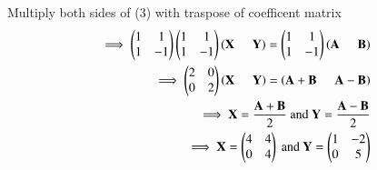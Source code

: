 \documentclass[journal]{IEEEtran}
\begin{document}
Multiply both sides of (3) with traspose of coefficent matrix
\begin{align}
    \implies \begin{pmatrix}
        1 & 1\\
         1 & -1
    \end{pmatrix} \begin{pmatrix}
        1 & 1\\
         1 & -1
    \end{pmatrix} \left(\mathbf{X}\hspace{0.5cm}\mathbf{Y}\right)=\begin{pmatrix}
        1 & 1\\
         1 & -1
    \end{pmatrix} \left(\mathbf{A}\hspace{0.5cm}\mathbf{B}\right)\\
    \implies \begin{pmatrix}
        2 & 0\\
         0 & 2
    \end{pmatrix} \left(\mathbf{X}\hspace{0.5cm}\mathbf{Y}\right)= \left(\mathbf{A+B}\hspace{0.5cm}\mathbf{A-B}\right)\\
    \implies \mathbf{X}=\frac{\mathbf{A+B}}{2} \text{ and } \mathbf{Y}=\frac{\mathbf{A-B}}{2}\\ \implies \mathbf{X}=\begin{pmatrix}
        4 & 4\\
         0 & 4
    \end{pmatrix} \text{ and } \mathbf{Y}=\begin{pmatrix}
        1 & -2\\
         0 & 5
    \end{pmatrix}
    \end{align}
\end{document}
